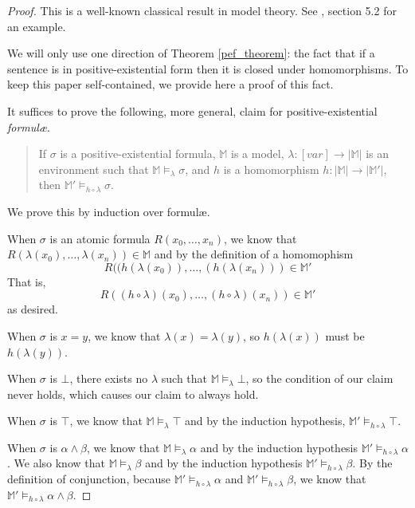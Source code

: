 		\begin{proof}
			This is a well-known classical result in model theory. See
			\cite{ChangKeisler73}, section 5.2 for an example.

			We will only use one direction of Theorem \ref{pef_theorem}: the
			fact that if a sentence is in positive-existential form then it is
			closed under homomorphisms. To keep this paper self-contained, we
			provide here a proof of this fact.

			It suffices to prove the following, more general, claim for
			positive-existential \emph{formul{\ae}}.

			\begin{quote}
				If $\sigma$ is a positive-existential formula, $\mathbb{M}$ is
				a model, $\lambda : [var] \to |\mathbb{M}|$ is an environment
				such that $\mathbb{M} \models_\lambda \sigma$, and $h$ is a
				homomorphism $h : |\mathbb{M}| \to |\mathbb{M}'|$, then
				$\mathbb{M}' \models_{h\circ\lambda} \sigma$.
			\end{quote}

			We prove this by induction over formul{\ae}.

			When $\sigma$ is an atomic formula $R(x_0,\ldots,x_n)$, we know
			that $R(\lambda(x_0),\ldots,\lambda(x_n)) \in \mathbb{M}$ and by
			the definition of a homomophism
				\[
				R((h(\lambda(x_0)),\ldots,(h(\lambda(x_n))) \in \mathbb{M}'
				\]
			That is,
				\[
				R((h\circ\lambda)(x_0),\ldots,(h\circ\lambda)(x_n)) \in \mathbb{M'}
				\]
			as desired.

			When $\sigma$ is $x=y$, we know that $\lambda(x) = \lambda(y)$, so
			$h(\lambda(x))$ must be $h(\lambda(y))$.

			When $\sigma$ is $\bot$, there exists no $\lambda$ such that
			$\mathbb{M} \models_\lambda \bot$, so the condition of our claim
			never holds, which causes our claim to always hold.

			When $\sigma$ is $\top$, we know that $\mathbb{M} \models_\lambda
			\top$ and by the induction hypothesis, $\mathbb{M}'
			\models_{h\circ\lambda} \top$.

			When $\sigma$ is $\alpha \wedge \beta$, we know that $\mathbb{M}
			\models_\lambda \alpha$ and by the induction hypothesis
			$\mathbb{M}' \models_{h\circ\lambda} \alpha$. We also know that
			$\mathbb{M} \models_\lambda \beta$ and by the induction hypothesis
			$\mathbb{M}' \models_{h\circ\lambda} \beta$. By the definition of
			conjunction, because $\mathbb{M}' \models_{h\circ\lambda} \alpha$
			and $\mathbb{M}' \models_{h\circ\lambda} \beta$, we know that
			$\mathbb{M}' \models_{h\circ\lambda} \alpha \wedge \beta$.


\end{proof}
